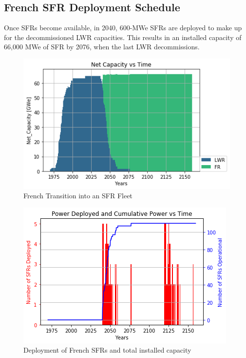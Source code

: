 \subsection{French \gls{SFR} Deployment Schedule}

Once \glspl{SFR} become available, in 2040,
600-MWe \glspl{SFR} are deployed to make up for the 
decommissioned \gls{LWR} capacities. 
This results in an installed capacity of 66,000 MWe
of \gls{SFR} by 2076, when the last \gls{LWR} decommissions.

\begin{figure}[htbp!]
        \begin{center}
                \includegraphics[scale=0.7]{./images/french-transition/power_plot.png}
        \end{center}
        \caption{French Transition into an SFR Fleet}
        \label{fig:sfr_num}
\end{figure}
\begin{figure}[htbp!]
	\begin{center}
		\includegraphics[scale=0.7]{./images/french-transition/sfr_deploy.png}
	\end{center}
	\caption{Deployment of French \glspl{SFR} and total installed capacity}
	\label{fig:dep}
\end{figure}
\FloatBarrier


